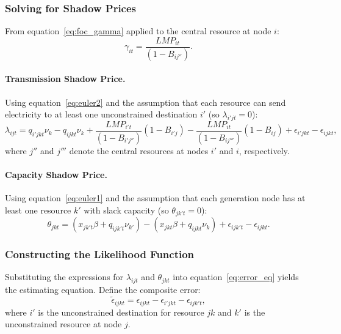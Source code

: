 \documentclass[12pt]{article}
\begin{document}
\subsubsection{Solving for Shadow Prices}

From equation~\eqref{eq:foc_gamma} applied to the central resource at node $i$:
\begin{equation}\label{eq:gamma}
    \gamma_{it} = \frac{LMP_{it}}{(1 - B_{ij''})}.
\end{equation}

\paragraph{Transmission Shadow Price.} Using equation~\eqref{eq:euler2} and the assumption that each resource can send electricity to at least one unconstrained destination $i'$ (so $\lambda_{i'jt} = 0$):
\begin{equation}\label{eq:lambda}
    \lambda_{ijt} = q_{i'jkt} \nu_k - q_{ijkt} \nu_k + \frac{LMP_{i't}}{(1 - B_{i'j''})}(1 - B_{i'j}) - \frac{LMP_{it}}{(1 - B_{ij'''})}(1 - B_{ij}) + \epsilon_{i'jkt} - \epsilon_{ijkt},
\end{equation}
where $j''$ and $j'''$ denote the central resources at nodes $i'$ and $i$, respectively.

\paragraph{Capacity Shadow Price.} Using equation~\eqref{eq:euler1} and the assumption that each generation node has at least one resource $k'$ with slack capacity (so $\theta_{jk't} = 0$):
\begin{equation}\label{eq:theta}
    \theta_{jkt} = (x_{jk't} \beta + q_{ijk't} \nu_{k'}) - (x_{jkt} \beta + q_{ijkt} \nu_k) + \epsilon_{ijk't} - \epsilon_{ijkt}.
\end{equation}

\subsubsection{Constructing the Likelihood Function}

Substituting the expressions for $\lambda_{ijt}$ and $\theta_{jkt}$ into equation~\eqref{eq:error_eq} yields the estimating equation. Define the composite error:
\begin{equation}\label{eq:composite_error}
    \tilde{\epsilon}_{ijkt} = \epsilon_{ijkt} - \epsilon_{i'jkt} - \epsilon_{ijk't},
\end{equation}
where $i'$ is the unconstrained destination for resource $jk$ and $k'$ is the unconstrained resource at node $j$.
\end{document}
